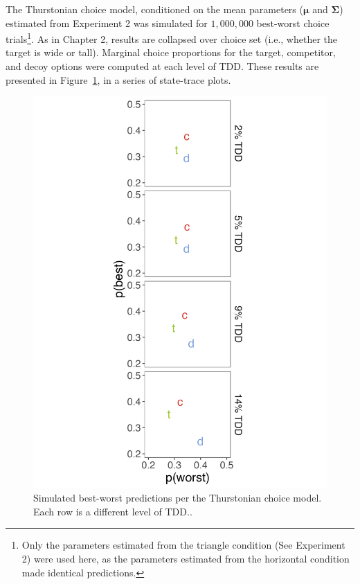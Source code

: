 The Thurstonian choice model, conditioned on the mean parameters ($\boldsymbol{\mu}$ and $\boldsymbol{\Sigma}$) estimated from Experiment 2 was simulated for $1,000,000$ best-worst choice trials\footnote{Only the parameters estimated from the triangle condition (See Experiment 2) were used here, as the parameters estimated from the horizontal condition made identical predictions.}. As in Chapter 2, results are collapsed over choice set (i.e., whether the target is wide or tall). Marginal choice proportions for the target, competitor, and decoy options were computed at each level of TDD. These results are presented in Figure~\ref{fig:bw_sim}, in a series of state-trace plots.
\begin{figure}
   \includegraphics[width=\linewidth]{figures/bw_preds_sigma_constant_comp_effect_no_outliers.jpeg}
   \caption{Simulated best-worst predictions per the Thurstonian choice model. Each row is a different level of TDD..}
   \label{fig:bw_sim}
\end{figure}


